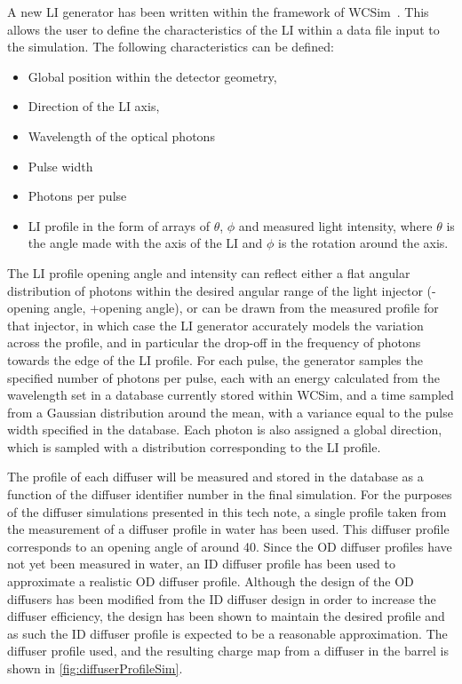 \documentclass[a4paper,11pt]{article}
\begin{document}
A new LI generator has been written within the framework of WCSim~\cite{WCSim}. This allows the user to define the characteristics of the LI within a data file input to the simulation. The following characteristics can be defined:
\begin{itemize}
    \item Global position within the detector geometry,
    \item Direction of the LI axis,
    \item Wavelength of the optical photons
    \item Pulse width
    \item Photons per pulse
    \item LI profile in the form of arrays of $\theta$, $\phi$ and measured light intensity, where $\theta$ is the angle made with the axis of the LI and $\phi$ is the rotation around the axis.
\end{itemize}

The LI profile opening angle and intensity can reflect either a flat angular distribution of photons within the desired angular range of the light injector (-opening angle, +opening angle), or can be drawn from the measured profile for that injector, in which case the LI generator accurately models the variation across the profile, and in particular the drop-off in the frequency of photons towards the edge of the LI profile. For each pulse, the generator samples the specified number of photons per pulse, each with an energy calculated from the wavelength set in a database currently stored within WCSim, and a time sampled from a Gaussian distribution around the mean, with a variance equal to the pulse width specified in the database. Each photon is also assigned a global direction, which is sampled with a distribution corresponding to the LI profile.

The profile of each diffuser will be measured and stored in the database as a function of the diffuser identifier number in the final simulation. For the purposes of the diffuser simulations presented in this tech note, a single profile taken from the measurement of a diffuser profile in water has been used. This diffuser profile corresponds to an opening angle of around 40\textdegree. Since the OD diffuser profiles have not yet been measured in water, an ID diffuser profile has been used to approximate a realistic OD diffuser profile. Although the design of the OD diffusers has been modified from the ID diffuser design in order to increase the diffuser efficiency, the design has been shown to maintain the desired profile and as such the ID diffuser profile is expected to be a reasonable approximation. The diffuser profile used, and the resulting charge map from a diffuser in the barrel is shown in \cref{fig:diffuserProfileSim}.
\end{document}
